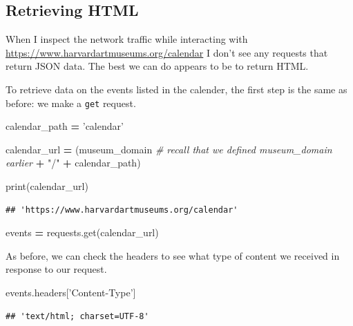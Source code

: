 \documentclass[]{book}
\newenvironment{Shaded}{\begin{snugshade}}{\end{snugshade}}
\newcommand{\BuiltInTok}[1]{#1}
\newcommand{\CommentTok}[1]{\textcolor[rgb]{0.56,0.35,0.01}{\textit{#1}}}
\newcommand{\NormalTok}[1]{#1}
\newcommand{\OperatorTok}[1]{\textcolor[rgb]{0.81,0.36,0.00}{\textbf{#1}}}
\newcommand{\StringTok}[1]{\textcolor[rgb]{0.31,0.60,0.02}{#1}}
\begin{document}
\hypertarget{retrieving-html}{%
\subsection{Retrieving HTML}\label{retrieving-html}}

When I inspect the network traffic while interacting with \url{https://www.harvardartmuseums.org/calendar} I don't see any requests that return JSON data. The best we can do appears to be to return HTML.

To retrieve data on the events listed in the calender, the first step is the same as before: we make a \texttt{get} request.

\begin{Shaded}
\begin{Highlighting}[]
\NormalTok{calendar_path }\OperatorTok{=} \StringTok{'calendar'}

\NormalTok{calendar_url }\OperatorTok{=}\NormalTok{ (museum_domain }\CommentTok{# recall that we defined museum_domain earlier}
                  \OperatorTok{+} \StringTok{"/"}
                  \OperatorTok{+}\NormalTok{ calendar_path)}

\BuiltInTok{print}\NormalTok{(calendar_url)}
\end{Highlighting}
\end{Shaded}

\begin{verbatim}
## 'https://www.harvardartmuseums.org/calendar'
\end{verbatim}

\begin{Shaded}
\begin{Highlighting}[]
\NormalTok{events }\OperatorTok{=}\NormalTok{ requests.get(calendar_url)}
\end{Highlighting}
\end{Shaded}

As before, we can check the headers to see what type of content we received in response to our request.

\begin{Shaded}
\begin{Highlighting}[]
\NormalTok{events.headers[}\StringTok{'Content-Type'}\NormalTok{]}
\end{Highlighting}
\end{Shaded}

\begin{verbatim}
## 'text/html; charset=UTF-8'
\end{verbatim}
\end{document}

